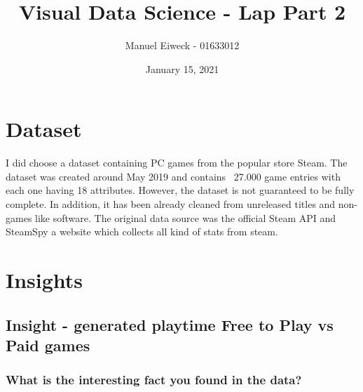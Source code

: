 \documentclass[11pt]{article}
\title{Visual Data Science - Lap Part 2}
\author{Manuel Eiweck - 01633012}
\date{January 15, 2021}
\begin{document}
\maketitle


\section{Dataset}

I did choose a dataset containing PC games from the popular store Steam. The dataset was created around May 2019 and contains ~27.000 game entries with each one having 18 attributes.
However, the dataset is not guaranteed to be fully complete. In addition, it has been already cleaned from unreleased titles and non-games like software. The original data source was the official Steam API and SteamSpy a website which collects all kind of stats from steam.




\section{Insights}

\subsection{Insight - generated playtime Free to Play vs Paid games}

\subsubsection{What is the interesting fact you found in the data?}
\end{document}
